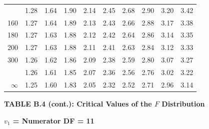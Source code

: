 \documentclass[10pt]{article}
\begin{document}
\begin{longtable}{@{}r!{\vrule width 0.8pt\hspace{0.55em}}rrrrrrrrr@{}}
 & 1.28 & 1.64 & 1.90 & 2.14 & 2.45 & 2.68 & 2.90 & 3.20 & 3.42 \\
160 & 1.27 & 1.64 & 1.89 & 2.13 & 2.43 & 2.66 & 2.88 & 3.17 & 3.38 \\
180 & 1.27 & 1.63 & 1.88 & 2.12 & 2.42 & 2.64 & 2.86 & 3.14 & 3.35 \\
200 & 1.27 & 1.63 & 1.88 & 2.11 & 2.41 & 2.63 & 2.84 & 3.12 & 3.33 \\
300 & 1.26 & 1.62 & 1.86 & 2.09 & 2.38 & 2.59 & 2.80 & 3.07 & 3.27 \\
 & 1.26 & 1.61 & 1.85 & 2.07 & 2.36 & 2.56 & 2.76 & 3.02 & 3.22 \\
$\infty$ & 1.25 & 1.60 & 1.83 & 2.05 & 2.32 & 2.52 & 2.71 & 2.96 & 3.14 \\
\end{longtable}
\newpage
\thispagestyle{empty}
\begin{center}
{\large\bfseries TABLE B.4 (cont.): Critical Values of the $F$ Distribution\par}
\end{center}
{\large\bfseries $v_1$ = Numerator DF = 11\par}
\vspace{0.5em}
\small
\end{document}
